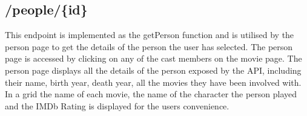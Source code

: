 \documentclass[12pt,a4paper]{article}
\begin{document}
			\begin{center}
			\end{center}

		\newpage

		\subsection{/people/\{id\}}
			This endpoint is implemented as the getPerson function and is utilised by the person page 
			to get the details of the person the user has selected. The person page is accessed by 
			clicking on any of the cast members on the movie page. The person page displays all the 
			details of the person exposed by the API, including their name, birth year, death year, 
			all the movies they have been involved with. In a grid the name of each movie, the name 
			of the character the person played and the IMDb Rating is displayed for the users 
			convenience.\\

			\begin{center}
			\end{center}
\end{document}
